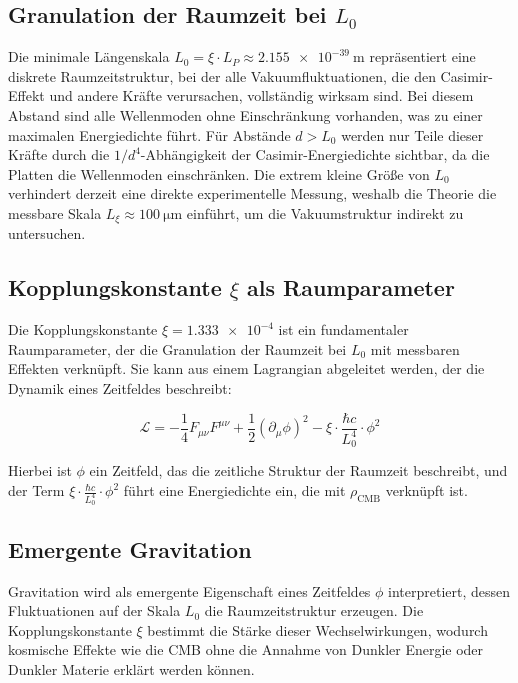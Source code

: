 	\subsection{Granulation der Raumzeit bei \( L_0 \)}
	
	Die minimale Längenskala \( L_0 = \xi \cdot L_P \approx \SI{2.155e-39}{\meter} \) repräsentiert eine diskrete Raumzeitstruktur, bei der alle Vakuumfluktuationen, die den Casimir-Effekt und andere Kräfte verursachen, vollständig wirksam sind. Bei diesem Abstand sind alle Wellenmoden ohne Einschränkung vorhanden, was zu einer maximalen Energiedichte führt. Für Abstände \( d > L_0 \) werden nur Teile dieser Kräfte durch die \( 1/d^4 \)-Abhängigkeit der Casimir-Energiedichte sichtbar, da die Platten die Wellenmoden einschränken. Die extrem kleine Größe von \( L_0 \) verhindert derzeit eine direkte experimentelle Messung, weshalb die Theorie die messbare Skala \( L_\xi \approx \SI{100}{\micro\meter} \) einführt, um die Vakuumstruktur indirekt zu untersuchen.
	
	\subsection{Kopplungskonstante \( \xi \) als Raumparameter}
	
	Die Kopplungskonstante \( \xi = \num{1.333e-4} \) ist ein fundamentaler Raumparameter, der die Granulation der Raumzeit bei \( L_0 \) mit messbaren Effekten verknüpft. Sie kann aus einem Lagrangian abgeleitet werden, der die Dynamik eines Zeitfeldes beschreibt:
	
	\begin{equation}
		\mathcal{L} = -\frac{1}{4} F_{\mu\nu} F^{\mu\nu} + \frac{1}{2} (\partial_\mu \phi)^2 - \xi \cdot \frac{\hbar c}{L_0^4} \cdot \phi^2 \label{eq:lagrangian}
	\end{equation}
	
	Hierbei ist \( \phi \) ein Zeitfeld, das die zeitliche Struktur der Raumzeit beschreibt, und der Term \( \xi \cdot \frac{\hbar c}{L_0^4} \cdot \phi^2 \) führt eine Energiedichte ein, die mit \( \rho_{\text{CMB}} \) verknüpft ist.
	
	\subsection{Emergente Gravitation}
	
	Gravitation wird als emergente Eigenschaft eines Zeitfeldes \( \phi \) interpretiert, dessen Fluktuationen auf der Skala \( L_0 \) die Raumzeitstruktur erzeugen. Die Kopplungskonstante \( \xi \) bestimmt die Stärke dieser Wechselwirkungen, wodurch kosmische Effekte wie die CMB ohne die Annahme von Dunkler Energie oder Dunkler Materie erklärt werden können.
	
